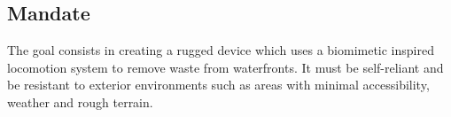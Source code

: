 
\subsection{Mandate}

The goal consists in creating a rugged device which uses a biomimetic inspired locomotion system to remove waste from waterfronts. It must be self-reliant and be resistant to exterior environments such as areas with minimal accessibility, weather and rough terrain.
